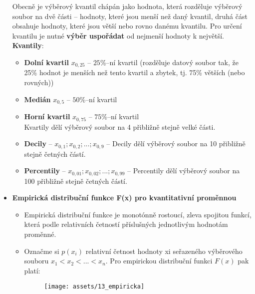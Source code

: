 \begin{itemize}
          Obecně je výběrový kvantil chápán jako hodnota, která rozděluje výběrový soubor na dvě části -- hodnoty, které jsou menší než daný kvantil, druhá část obsahuje hodnoty, které jsou větší nebo rovno danému kvantilu. Pro určení kvantilu je nutné \textbf{výběr uspořádat} od nejmenší hodnoty k největší. \textbf{Kvantily}:
          \begin{itemize}
              \item \textbf{Dolní kvartil} $x_{0,25}$ -- $25\%$--ní kvartil  (rozděluje datový soubor tak, že 25\% hodnot je menších než tento kvartil a zbytek, tj. 75\% větších (nebo rovných))
              \item \textbf{Medián} $x_{0,5}$ -- $50\%$--ní kvartil
              \item \textbf{Horní kvartil} $x_{0,75}$ -- $75\%$--ní kvartil\\
                    Kvartily dělí výběrový soubor na 4 přibližně stejně velké části.
              \item \textbf{Decily} -- $x_{0,1};x_{0,2};...;x_{0,9}$ -- Decily dělí výběrový soubor na 10 přibližně stejně četných částí.
              \item \textbf{Percentily} -- $x_{0,01};x_{0,02};...;x_{0,99}$ -- Percentily dělí výběrový soubor na 100 přibližně stejně četných částí.
          \end{itemize}

    \item \textbf{Empirická distribuční funkce F(x) pro kvantitativní proměnnou}
          \begin{itemize}
              \item Empirická distribuční funkce je monotónně rostoucí, zleva spojitou funkcí, která  podle relativních četností příslušných jednotlivým hodnotám proměnné.
              \item Označme si $p(x_i)$ relativní četnost hodnoty xi seřazeného výběrového souboru $x_1 < x_2 < ... < x_n$. Pro empirickou distribuční funkci $F(x)$ pak platí:
                    \begin{figure}[H]
                        \centering
                        \texttt{[image: assets/13\_empiricka]}
                    \end{figure}
          \end{itemize}


\end{itemize}
